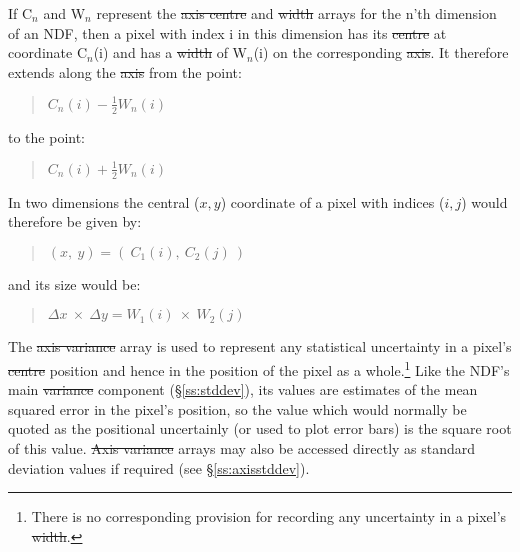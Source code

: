 If C$_{n}$ and W$_{n}$ represent the \st{axis centre\/} and \st{width\/}
arrays for the n'th dimension of an NDF, then a pixel with index i in this
dimension has its \st{centre\/} at coordinate C$_{n}$(i) and has a
\st{width\/} of W$_{n}$(i) on the corresponding \st{axis}.  
It therefore extends along the \st{axis\/} from the point:

\small
\begin{quote}
\begin{center}
$C_{n}(i) - \frac{1}{2} W_{n}(i)$
\end{center}
\end{quote}
\normalsize

to the point:

\small
\begin{quote}
\begin{center}
$C_{n}(i) + \frac{1}{2} W_{n}(i)$
\end{center}
\end{quote}
\normalsize

In two dimensions the central ($x,y$) coordinate of a pixel with indices
($i,j$) would therefore be given by: 

\small
\begin{quote}
\begin{center}
$(x,\: y) = (\: C_{1}(i),\: C_{2}(j) \: )$
\end{center}
\end{quote}
\normalsize

and its size would be: 

\small
\begin{quote}
\begin{center}
$\Delta x \: \times \: \Delta y = W_{1}(i) \: \times \: W_{2}(j)$
\end{center}
\end{quote}
\normalsize

The \st{axis variance\/} array is used to represent any statistical
uncertainty in a pixel's \st{centre\/} position and hence in the position
of the pixel as a whole.\footnote{There is no corresponding provision for
recording any uncertainty in a pixel's \st{width}.} 
Like the NDF's main \st{variance\/} component (\S\ref{ss:stddev}), its
values are estimates of the mean squared error in the pixel's position, so
the value which would normally be quoted as the positional uncertainly (or
used to plot error bars) is the square root of this value. 
\st{Axis variance\/} arrays may also be accessed directly as standard
deviation values if required (see \S\ref{ss:axisstddev}). 

